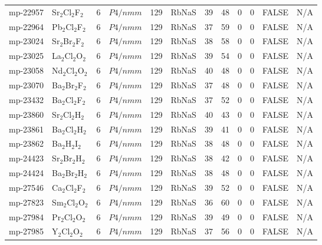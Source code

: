 {\begin{longtable}{llcccccccccc}
    mp-22957 & Sr$_{2}$Cl$_{2}$F$_{2}$ & 6     & $P4/nmm$ & 129   & RbNaS & 39    & 48    & 0     & 0     & FALSE & N/A \\
    mp-22964 & Pb$_{2}$Cl$_{2}$F$_{2}$ & 6     & $P4/nmm$ & 129   & RbNaS & 37    & 59    & 0     & 0     & FALSE & N/A \\
    mp-23024 & Sr$_{2}$Br$_{2}$F$_{2}$ & 6     & $P4/nmm$ & 129   & RbNaS & 38    & 58    & 0     & 0     & FALSE & N/A \\
    mp-23025 & La$_{2}$Cl$_{2}$O$_{2}$ & 6     & $P4/nmm$ & 129   & RbNaS & 39    & 54    & 0     & 0     & FALSE & N/A \\
    mp-23058 & Nd$_{2}$Cl$_{2}$O$_{2}$ & 6     & $P4/nmm$ & 129   & RbNaS & 40    & 48    & 0     & 0     & FALSE & N/A \\
    mp-23070 & Ba$_{2}$Br$_{2}$F$_{2}$ & 6     & $P4/nmm$ & 129   & RbNaS & 37    & 48    & 0     & 0     & FALSE & N/A \\
    mp-23432 & Ba$_{2}$Cl$_{2}$F$_{2}$ & 6     & $P4/nmm$ & 129   & RbNaS & 37    & 52    & 0     & 0     & FALSE & N/A \\
    mp-23860 & Sr$_{2}$Cl$_{2}$H$_{2}$ & 6     & $P4/nmm$ & 129   & RbNaS & 40    & 43    & 0     & 0     & FALSE & N/A \\
    mp-23861 & Ba$_{2}$Cl$_{2}$H$_{2}$ & 6     & $P4/nmm$ & 129   & RbNaS & 39    & 41    & 0     & 0     & FALSE & N/A \\
    mp-23862 & Ba$_{2}$H$_{2}$I$_{2}$ & 6     & $P4/nmm$ & 129   & RbNaS & 38    & 48    & 0     & 0     & FALSE & N/A \\
    mp-24423 & Sr$_{2}$Br$_{2}$H$_{2}$ & 6     & $P4/nmm$ & 129   & RbNaS & 38    & 42    & 0     & 0     & FALSE & N/A \\
    mp-24424 & Ba$_{2}$Br$_{2}$H$_{2}$ & 6     & $P4/nmm$ & 129   & RbNaS & 38    & 48    & 0     & 0     & FALSE & N/A \\
    mp-27546 & Ca$_{2}$Cl$_{2}$F$_{2}$ & 6     & $P4/nmm$ & 129   & RbNaS & 39    & 52    & 0     & 0     & FALSE & N/A \\
    mp-27823 & Sm$_{2}$Cl$_{2}$O$_{2}$ & 6     & $P4/nmm$ & 129   & RbNaS & 36    & 60    & 0     & 0     & FALSE & N/A \\
    mp-27984 & Pr$_{2}$Cl$_{2}$O$_{2}$ & 6     & $P4/nmm$ & 129   & RbNaS & 39    & 49    & 0     & 0     & FALSE & N/A \\
    mp-27985 & Y$_{2}$Cl$_{2}$O$_{2}$ & 6     & $P4/nmm$ & 129   & RbNaS & 37    & 56    & 0     & 0     & FALSE & N/A \\

\end{longtable}}
